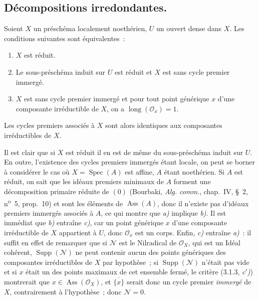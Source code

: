 \subsection{Décompositions irredondantes.}

\begin{proposition}[3.2.1]
\label{IV.2.3.2.1-fr}
Soient $X$ un préschéma localement noethérien, $U$ un ouvert dense dans $X$.
Les conditions suivantes sont équivalentes~:
\begin{enumerate}
\item[\emph{a)}] $X$ est réduit.
\item[\emph{b)}] Le sous-préschéma induit sur $U$ est réduit et $X$ est sans
cycle premier immergé.
\item[\emph{c)}] $X$ est sans cycle premier immergé et pour tout point
générique $x$ d'une composante irréductible de $X$, on a
$\operatorname{long}(\mathcal O_x)=1$.
\end{enumerate}
Les cycles premiers associés à $X$ sont alors identiques aux composantes
irréductibles de $X$.
\end{proposition}

Il est clair que si $X$ est réduit il en est de même du sous-préschéma induit
sur $U$. En outre, l'existence des cycles premiers immergés étant locale, on
peut se borner à considérer le cas où $X=\operatorname{Spec}(A)$ est affine,
$A$ étant noethérien. Si $A$ est réduit, on sait que les idéaux premiers
minimaux de $A$ forment une décomposition primaire réduite de $(0)$
(Bourbaki, \emph{Alg. comm.}, chap.~IV, \S~2, n\textsuperscript{o}~5,
prop.~10) et sont les éléments de $\operatorname{Ass}(A)$, donc il n'existe
pas d'idéaux premiers immergés associés à $A$, ce qui montre que \emph{a)}
implique \emph{b)}. Il est immédiat que \emph{b)} entraîne \emph{c)}, car un
point générique $x$ d'une composante irréductible de $X$ appartient à $U$,
donc $\mathcal O_x$ est un corps. Enfin, \emph{c)} entraîne \emph{a)}~: il
suffit en effet de remarquer que si $\mathcal N$ est le Nilradical de
$\mathcal O_X$, qui est un Idéal cohérent, $\operatorname{Supp}(\mathcal N)$
ne peut contenir aucun des points génériques des composantes irréductibles de
$X$ par hypothèse~; si $\operatorname{Supp}(\mathcal N)$ n'était pas vide et
si $x$ était un des points maximaux de cet ensemble fermé, le critère
(3.1.3, \emph{c$'$)}) montrerait que $x\in\operatorname{Ass}(\mathcal O_X)$,
et $\overline{\{x\}}$ serait donc un cycle premier \emph{immergé} de $X$,
contrairement à l'hypothèse~; donc $\mathcal N=0$.

